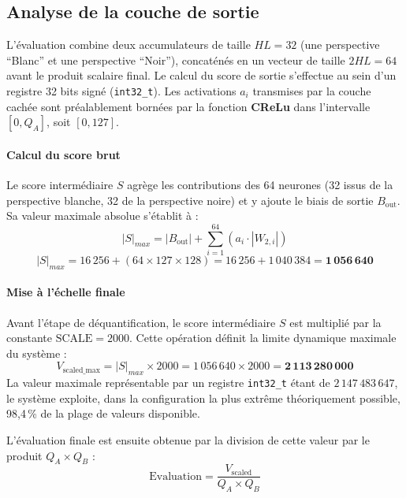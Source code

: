 \documentclass[11pt, a4paper]{article}
\begin{document}
\subsection{Analyse de la couche de sortie}

L'évaluation combine deux accumulateurs de taille $HL=32$ (une perspective ``Blanc'' et une perspective ``Noir''), concaténés en un vecteur de taille $2HL=64$ avant le produit scalaire final. Le calcul du score de sortie s'effectue au sein d'un registre 32 bits signé (\texttt{int32\_t}). Les activations $a_i$ transmises par la couche cachée sont préalablement bornées par la fonction \textbf{CReLu} dans l'intervalle $[0, Q_A]$, soit $[0, 127]$.

\paragraph{Calcul du score brut}
Le score intermédiaire $S$ agrège les contributions des 64 neurones (32 issus de la perspective blanche, 32 de la perspective noire) et y ajoute le biais de sortie $B_{\text{out}}$. Sa valeur maximale absolue s'établit à :
\begin{equation}
    |S|_{max} = |B_{\text{out}}| + \sum_{i=1}^{64} (a_i \cdot |W_{2,i}|)
\end{equation}
\begin{equation}
    |S|_{max} = 16\,256 + (64 \times 127 \times 128) = 16\,256 + 1\,040\,384 = \mathbf{1\,056\,640}
\end{equation}

\paragraph{Mise à l'échelle finale}
Avant l'étape de déquantification, le score intermédiaire $S$ est multiplié par la constante $\text{SCALE} = 2000$. Cette opération définit la limite dynamique maximale du système :
\begin{equation}
    V_{\text{scaled\_max}} = |S|_{max} \times 2000 = 1\,056\,640 \times 2000 = \mathbf{2\,113\,280\,000}
\end{equation}
La valeur maximale représentable par un registre \texttt{int32\_t} étant de $2\,147\,483\,647$, le système exploite, dans la configuration la plus extrême théoriquement possible, 98,4\,\% de la plage de valeurs disponible.

L'évaluation finale est ensuite obtenue par la division de cette valeur par le produit $Q_A \times Q_B$ :
\begin{equation}
    \text{Evaluation} = \frac{V_{\text{scaled}}}{Q_A \times Q_B}
\end{equation}
\end{document}
